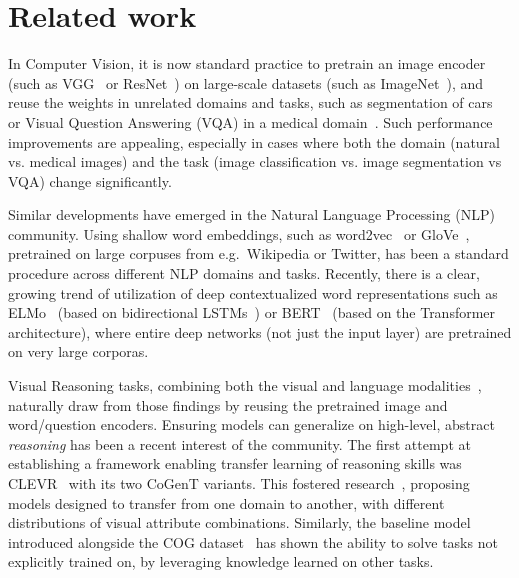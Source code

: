 \section{Related work}
\label{sec:related_work}

In Computer Vision, it is now standard practice to pretrain an image encoder (such as VGG~\cite{simonyan2014very} or ResNet~\cite{he2016deep}) on large-scale datasets (such as ImageNet~\cite{deng2009imagenet}), and reuse the weights in unrelated domains and tasks, such as segmentation of cars~\cite{iglovikov2018ternausnet} or Visual Question Answering (VQA) in a medical domain~\cite{kornuta2019leveraging}.
Such performance improvements are appealing, especially in cases where both the domain (natural vs. medical images) and the task (image classification vs. image segmentation vs VQA) change significantly.

Similar developments have emerged in the Natural Language Processing (NLP) community.
Using shallow word embeddings, such as word2vec~\cite{mikolov2013distributed} or GloVe~\cite{pennington2014glove}, pretrained on large corpuses from e.g.\ Wikipedia or Twitter, has been a standard procedure across different NLP domains and tasks.
Recently, there is a clear, growing trend of utilization of deep contextualized word representations such as ELMo~\cite{peters2018deep} (based on bidirectional LSTMs~\cite{hochreiter1997long}) or BERT~\cite{devlin2018bert} (based on the Transformer~\cite{vaswani2017attention} architecture), where entire deep networks (not just the input layer) are pretrained on very large corporas.

Visual Reasoning tasks, combining both the visual and language modalities~\cite{mogadala2019trends}, naturally draw from those findings by reusing the pretrained image and word/question encoders.
Ensuring models can generalize on high-level, abstract \emph{reasoning} has been a recent interest of the community.
The first attempt at establishing a framework enabling transfer learning of reasoning skills was CLEVR~\cite{johnson2017clevr} with its two CoGenT variants.
This fostered research~\cite{mascharka2018transparency, perez2018film, johnson2017inferring,marois2018transfer}, proposing models designed to transfer from one domain to another, with different distributions of visual attribute combinations.
Similarly, the baseline model introduced alongside the COG dataset~\cite{yang2018dataset} has shown the ability to solve tasks not explicitly trained on, by leveraging knowledge learned on other tasks.

